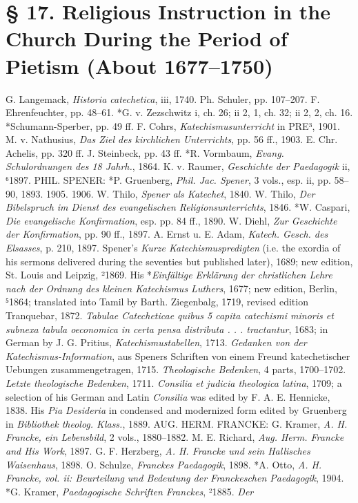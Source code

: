 \section[§ 17. The Period of Pietism]{§ 17. Religious Instruction in the Church During the Period of Pietism (About 1677–1750)}

G. Langemack, \emph{Historia catechetica}, iii, 1740. Ph. Schuler, pp. 107–207. F. Ehrenfeuchter, pp. 48–61. *G. v. Zezschwitz i, ch. 26; ii 2, 1, ch. 32; ii 2, 2, ch. 16. *Schumann-Sperber, pp. 49 ff. F. Cohrs, \emph{Katechismusunterricht} in PRE³, 1901. M. v. Nathusius, \emph{Das Ziel des kirchlichen Unterrichts}, pp. 56 ff., 1903. E. Chr. Achelis, pp. 320 ff. J. Steinbeck, pp. 43 ff. *R. Vormbaum, \emph{Evang. Schulordnungen des 18 Jahrh.}, 1864. K. v. Raumer, \emph{Geschichte der Paedagogik} ii, ⁶1897. PHIL. SPENER: *P. Gruenberg, \emph{Phil. Jac. Spener}, 3 vols., esp. ii, pp. 58–90, 1893. 1905. 1906. W. Thilo, \emph{Spener als Katechet}, 1840. W. Thilo, \emph{Der Bibelspruch im Dienst des evangelischen Religionsunterrichts}, 1846. *W. Caspari, \emph{Die evangelische Konfirmation}, esp. pp. 84 ff., 1890. W. Diehl, \emph{Zur Geschichte der Konfirmation}, pp. 90 ff., 1897. A. Ernst u. E. Adam, \emph{Katech. Gesch. des Elsasses}, p. 210, 1897. Spener’s \emph{Kurze Katechismuspredigten} (i.e. the exordia of his sermons delivered during the seventies but published later), 1689; new edition, St. Louis and Leipzig, ²1869. His *\emph{Einfältige Erklärung der christlichen Lehre nach der Ordnung des kleinen Katechismus Luthers}, 1677; new edition, Berlin, ⁵1864; translated into Tamil by Barth. Ziegenbalg, 1719, revised edition Tranquebar, 1872. \emph{Tabulae Catecheticae quibus 5 capita catechismi minoris et subnexa tabula oeconomica in certa pensa distributa . . . tractantur}, 1683; in German by J. G. Pritius, \emph{Katechismustabellen}, 1713. \emph{Gedanken von der Katechismus-Information}, aus Speners Schriften von einem Freund katechetischer Uebungen zusammengetragen, 1715. \emph{Theologische Bedenken}, 4 parts, 1700–1702. \emph{Letzte theologische Bedenken}, 1711. \emph{Consilia et judicia theologica latina}, 1709; a selection of his German and Latin \emph{Consilia} was edited by F. A. E. Hennicke, 1838. His \emph{Pia Desideria} in condensed and modernized form edited by Gruenberg in \emph{Bibliothek theolog. Klass.}, 1889. AUG. HERM. FRANCKE: G. Kramer, \emph{A. H. Francke, ein Lebensbild}, 2 vols., 1880–1882. M. E. Richard, \emph{Aug. Herm. Francke and His Work}, 1897. G. F. Herzberg, \emph{A. H. Francke und sein Hallisches Waisenhaus}, 1898. O. Schulze, \emph{Franckes Paedagogik}, 1898. *A. Otto, \emph{A. H. Francke, vol. ii: Beurteilung und Bedeutung der Franckeschen Paedagogik}, 1904. *G. Kramer, \emph{Paedagogische Schriften Franckes}, ²1885. \emph{Der}
